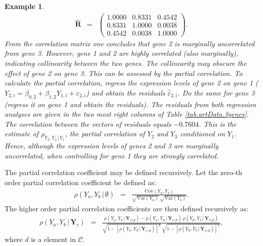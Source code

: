 \documentclass[a4paper]{article}
\theoremstyle{myexamplestyle}
\newtheorem{example}{Example}
\begin{document}
\begin{example}
\begin{eqnarray*}
\hat{\mathbf{R}} & = & 
\left(
\begin{array}{rrr}
1.0000 & 0.8331 & 0.4542
\\
0.8331 & 1.0000 & 0.0038
\\
0.4542 & 0.0038 & 1.0000
\end{array}
\right).
\end{eqnarray*}
From the correlation matrix one concludes that gene 2 is marginally uncorrelated from gene 3. However, gene 1 and 2 are highly correlated (also marginally), indicating collinearity between the two genes. The collinearity may obscure the effect of gene 2 on gene 3. This can be assessed by the partial correlation. To calculate the partial correlation, regress the expression levels of gene 2 on gene 1 ($Y_{2,i} = \beta_{0,2} + \beta_{1,2} Y_{1,i} + \varepsilon_{2,i}$) and obtain the residuals $\hat{\varepsilon}_{2,i}$. Do the same for gene 3 (regress it on gene 1 and obtain the residuals). The residuals from both regression analyses are given in the two most right columns of Table \ref{tab.artData.3genes}. The correlation between the vectors of residuals equals $-0.7604$. This is the estimate of $\rho_{Y_2, Y_3 \, | \, Y_1}$, the partial correlation of $Y_2$ and $Y_3$ conditioned on $Y_1$. Hence, although the expression levels of genes 2 and 3 are marginally uncorrelated, when controlling for gene 1 they are strongly correlated. 
\end{example}


The partial correlation coefficient may be defined recursively. Let the zero-th order partial correlation coefficient be defined as:
\begin{eqnarray*}
\rho ( Y_a, Y_b \, | \, \emptyset ) & = & \frac{\mbox{Cov}(Y_a, Y_b)}{\sqrt{\mbox{Var}(Y_a)} \, \sqrt{\mbox{Var}(Y_b)}}.
\end{eqnarray*}
The higher order partial correlation coefficients are then defined recursively as:
\begin{eqnarray} \label{form.recursivePartCor}
\rho ( Y_a, Y_b \, | \, \mathbf{Y}_c ) & = & \frac{ \rho (Y_a, Y_b \, | \, \mathbf{Y}_{c \setminus d  } )
- \rho ( Y_a, Y_d \, | \, \mathbf{Y}_{c \setminus d } )   \, \rho (Y_d, Y_b \, | \, \mathbf{Y}_{c \setminus d })
}{ \sqrt{ 1 - [\rho ( Y_a, Y_d \, | \, \mathbf{Y}_{c \setminus d } )]^2 } \, \sqrt{ 1 - [\rho ( Y_d, Y_b \, | \, \mathbf{Y}_{c \setminus d } )]^2 } } ,
\end{eqnarray}
where $d$ is a element in $\mathcal{C}$.
\end{document}
